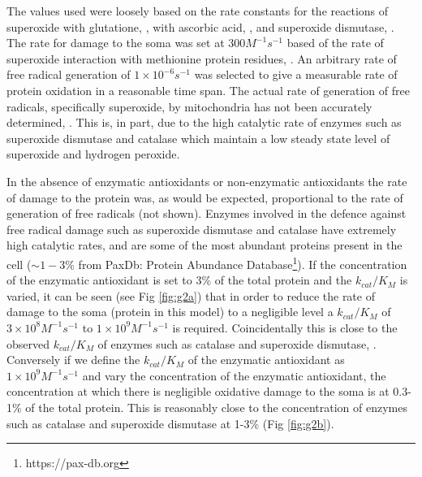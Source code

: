 \documentclass[preprint,12pt,authoryear]{elsarticle}
\begin{document}
The values used were loosely based on the rate constants for the reactions of superoxide with glutatione, \citet{Winterbourn:2016cu}, 
with ascorbic acid, \citet{Buettner:1996vo},
and superoxide dismutase, \citet{Milgrom:2016iw}. The rate for damage to the soma was set at $300 M^{-1} s^{-1}$ based of the rate of superoxide
interaction with methionine protein residues, \citet{Davies:2016kz}.
An arbitrary rate of free radical generation of $1 \times 10^{-6} s^{-1}$ was selected to give a
measurable rate of protein oxidation in a reasonable time span. The actual rate of
generation of free radicals, specifically superoxide, by mitochondria has not been accurately determined, \cite{Murphy:2009jy}. 
This is, in part, due to the high catalytic rate of enzymes such as superoxide dismutase and catalase which maintain a low steady state level of superoxide and hydrogen peroxide.

In the absence of enzymatic antioxidants or non-enzymatic antioxidants the rate of damage to the protein was, as would be
expected, proportional to the rate of generation of free radicals (not shown).
Enzymes involved in the defence against free radical damage such as superoxide dismutase and catalase have extremely high catalytic rates, and are some of the most abundant proteins present in the cell ($\sim 1-3$\% from PaxDb:
Protein Abundance Database\footnote{https://pax-db.org}). If the concentration of the enzymatic antioxidant is
set to 3\% of the total protein and the $k_{cat}/K_M$ is varied, it can be seen (see Fig \ref{fig:g2a}) that
in order to reduce the rate of damage to the soma (protein in this model) to a negligible level a $k_{cat}/K_M$ of
$3 \times 10^8 M^{-1} s^{-1}$ to $1 \times 10^9 M^{-1} s^{-1}$ is required.
Coincidentally this is close to the observed
$k_{cat}/K_M$ of enzymes such as catalase and superoxide dismutase, \citet{Milgrom:2016iw}. Conversely if we define the $k_{cat}/K_M$ of
the enzymatic antioxidant as $1 \times 10^9 M^{-1} s^{-1}$ and vary the concentration of the enzymatic antioxidant, the
concentration at which there is negligible oxidative damage to the soma is at
0.3-1\% of the total protein. This is reasonably close to the concentration of enzymes such as catalase and superoxide dismutase
at 1-3\% (Fig \ref{fig:g2b}).
\end{document}
